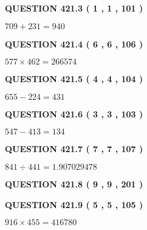 \documentclass{ctexart}
\begin{document}
  
  
\vspace{0.2in}
  
{\textbf{\Large{QUESTION
421.3 
 ( 1 , 1 , 101 )
}}}
  
  
 
 

$ %
709 +  %
231=   %
940$
 
 
  
\vspace{0.2in}
  
{\textbf{\Large{QUESTION
421.4 
 ( 6 , 6 , 106 )
}}}
  
  
 
 

$ %
577 \times  %
462=   %
266574$
 
 
  
\vspace{0.2in}
  
{\textbf{\Large{QUESTION
421.5 
 ( 4 , 4 , 104 )
}}}
  
  
 
 

$ %
655 -  %
224=   %
431$
 
 
  
\vspace{0.2in}
  
{\textbf{\Large{QUESTION
421.6 
 ( 3 , 3 , 103 )
}}}
  
  
 
 

$ %
547 -  %
413=   %
134$
 
 
  
\vspace{0.2in}
  
{\textbf{\Large{QUESTION
421.7 
 ( 7 , 7 , 107 )
}}}
  
  
 
 

$ %
841 \div  %
441=   %
1.907029478$
 
 
  
\vspace{0.2in}
  
{\textbf{\Large{QUESTION
421.8 
 ( 9 , 9 , 201 )
}}}
  
  
  
\vspace{0.2in}
  
{\textbf{\Large{QUESTION
421.9 
 ( 5 , 5 , 105 )
}}}
  
  
 
 

$ %
916 \times  %
455=   %
416780$
 
\end{document}
